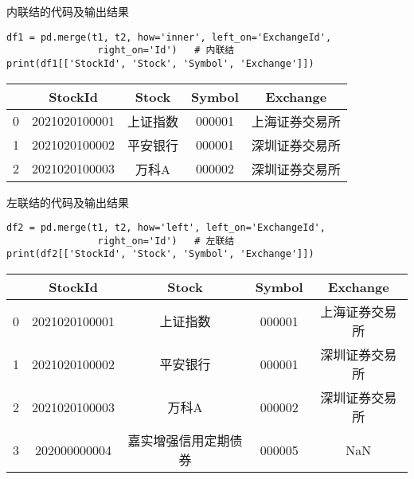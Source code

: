 \documentclass[t]{beamer}
\begin{document}
\begin{frame}[fragile]{内联结的代码及输出结果}
\begin{lstlisting}
df1 = pd.merge(t1, t2, how='inner', left_on='ExchangeId',
                right_on='Id')   # 内联结
print(df1[['StockId', 'Stock', 'Symbol', 'Exchange']])               
\end{lstlisting}
\begin{center}
  \begin{tabular}{ccccc}
    \hline
   & StockId& Stock & Symbol& Exchange\\
   \hline
    0&  2021020100001&  上证指数 & 000001 & 上海证券交易所\\
    1 & 2021020100002 & 平安银行  &000001&  深圳证券交易所\\
    2  &2021020100003  & 万科A  &000002&  深圳证券交易所\\
    \hline
  \end{tabular}
\end{center}
\end{frame}

\begin{frame}[fragile]{左联结的代码及输出结果}
  \begin{lstlisting}
df2 = pd.merge(t1, t2, how='left', left_on='ExchangeId',
                right_on='Id')   # 左联结
print(df2[['StockId', 'Stock', 'Symbol', 'Exchange']])               
  \end{lstlisting}
  \normalsize
  \begin{center}
    \begin{tabular}{ccccc}
      \hline
     & StockId& Stock & Symbol& Exchange\\
     \hline
      0&  2021020100001&  上证指数 & 000001 & 上海证券交易所\\
      1 & 2021020100002 & 平安银行  &000001&  深圳证券交易所\\
      2  &2021020100003  & 万科A  &000002&  深圳证券交易所\\
      3 &  202000000004 & 嘉实增强信用定期债券 & 000005 &     NaN\\
      \hline
    \end{tabular}
  \end{center}
  \end{frame}
\end{document}

